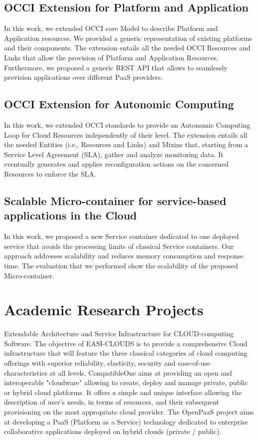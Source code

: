 \documentclass[11pt,a4paper,sans]{moderncv}   %
\begin{document}
\subsection{OCCI Extension for Platform and Application}
In this work, we extended OCCI core Model to describe Platform and Application resources. We provided a generic representation of existing platforms and their components. The extension entails all the needed OCCI Resources and Links that allow the provision of Platform and Application Resources. Furthermore, we proposed a generic REST API that allows to seamlessly provision applications over different PaaS providers.
\subsection{OCCI Extension for Autonomic Computing}
 In this work, we extended OCCI standards to provide an Autonomic Computing Loop for Cloud Resources independently of their level. The extension entails all the needed Entities 
(i.e., Resources and Links) and Mixins that, starting from a Service Level Agreement (SLA), gather and analyze monitoring data. It eventually generates and applies reconfiguration 
actions on the concerned Resources to enforce the SLA.
\subsection{Scalable Micro-container for service-based applications in the Cloud}
In this work, we proposed a new Service container dedicated to one deployed service that avoids the processing limits of classical Service containers. Our approach addresses scalability and reduces memory consumption and response time. The evaluation that we performed show the scalability of the proposed Micro-container.

\section{Academic Research Projects}
 {Extendable Architecture and Service Infrastructure for CLOUD-computing Software. The objective of EASI-CLOUDS is to provide a 
comprehensive Cloud infrastructure that will feature the three classical categories of cloud computing offerings with superior reliability, elasticity, security and 
ease-of-use characteristics at all levels.}
 {CompatibleOne aims at providing an open and interoperable "cloudware" allowing to create, deploy 
and manage private, public or hybrid cloud platforms. It offers a simple and unique interface allowing the description of user's needs, in terms of 
resources, and their subsequent provisioning on the most appropriate cloud provider.}
 {The OpenPaaS project aims at developing a PaaS (Platform as a Service) technology dedicated to 
enterprise collaborative applications deployed on hybrid clouds (private / public).}
\end{document}
